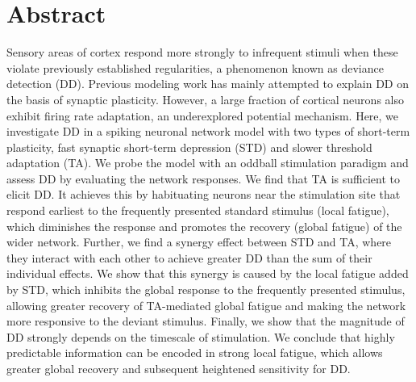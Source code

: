 \documentclass[10pt,letterpaper]{article}
\begin{document}
\section*{Abstract}
Sensory areas of cortex respond more strongly to infrequent stimuli when these violate previously established regularities, a phenomenon known as deviance detection (DD). Previous modeling work has mainly attempted to explain DD on the basis of synaptic plasticity. However, a large fraction of cortical neurons also exhibit firing rate adaptation, an underexplored potential mechanism. Here, we investigate DD in a spiking neuronal network model with two types of short-term plasticity, fast synaptic short-term depression (STD) and slower threshold adaptation (TA). We probe the model with an oddball stimulation paradigm and assess DD by evaluating the network responses. We find that TA is sufficient to elicit DD. It achieves this by habituating neurons near the stimulation site that respond earliest to the frequently presented standard stimulus (local fatigue), which diminishes the response and promotes the recovery (global fatigue) of the wider network. Further, we find a synergy effect between STD and TA, where they interact with each other to achieve greater DD than the sum of their individual effects. We show that this synergy is caused by the local fatigue added by STD, which inhibits the global response to the frequently presented stimulus, allowing greater recovery of TA-mediated global fatigue and making the network more responsive to the deviant stimulus. Finally, we show that the magnitude of DD strongly depends on the timescale of stimulation. We conclude that highly predictable information can be encoded in strong local fatigue, which allows greater global recovery and subsequent heightened sensitivity for DD.


\end{document}
